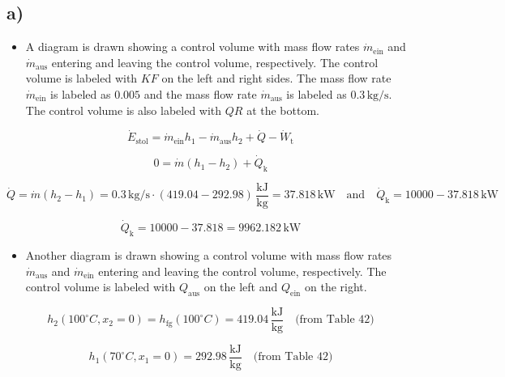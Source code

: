 

\subsection*{a)}

\begin{itemize}
    \item A diagram is drawn showing a control volume with mass flow rates $\dot{m}_{\text{ein}}$ and $\dot{m}_{\text{aus}}$ entering and leaving the control volume, respectively. The control volume is labeled with $KF$ on the left and right sides. The mass flow rate $\dot{m}_{\text{ein}}$ is labeled as $0.005$ and the mass flow rate $\dot{m}_{\text{aus}}$ is labeled as $0.3 \, \text{kg/s}$. The control volume is also labeled with $QR$ at the bottom.
\end{itemize}

\[
\dot{E}_{\text{stol}} = \dot{m}_{\text{ein}} h_1 - \dot{m}_{\text{aus}} h_2 + \dot{Q} - \dot{W}_{\text{t}}
\]

\[
0 = \dot{m} (h_1 - h_2) + \dot{Q}_{\text{k}}
\]

\[
\dot{Q} = \dot{m} (h_2 - h_1) = 0.3 \, \text{kg/s} \cdot (419.04 - 292.98) \, \frac{\text{kJ}}{\text{kg}} = 37.818 \, \text{kW} \quad \text{and} \quad \dot{Q}_{\text{k}} = 10000 - 37.818 \, \text{kW}
\]

\[
\dot{Q}_{\text{k}} = 10000 - 37.818 = 9962.182 \, \text{kW}
\]

\begin{itemize}
    \item Another diagram is drawn showing a control volume with mass flow rates $\dot{m}_{\text{aus}}$ and $\dot{m}_{\text{ein}}$ entering and leaving the control volume, respectively. The control volume is labeled with $Q_{\text{aus}}$ on the left and $Q_{\text{ein}}$ on the right.
\end{itemize}

\[
h_2 (100^\circ C, x_2 = 0) = h_{\text{fg}} (100^\circ C) = 419.04 \, \frac{\text{kJ}}{\text{kg}} \quad \text{(from Table 42)}
\]

\[
h_1 (70^\circ C, x_1 = 0) = 292.98 \, \frac{\text{kJ}}{\text{kg}} \quad \text{(from Table 42)}
\]
